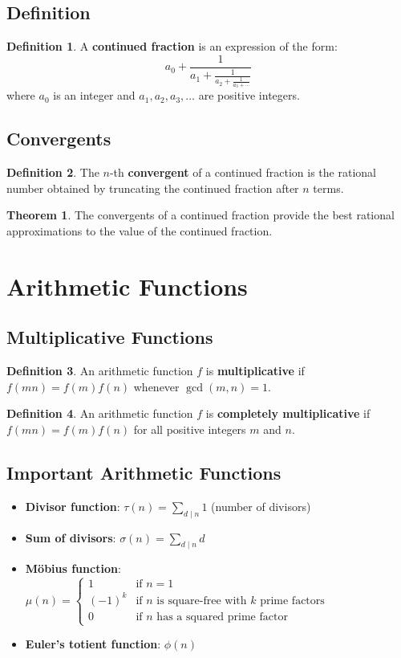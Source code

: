 \documentclass[11pt]{article}
\theoremstyle{definition}
\newtheorem{definition}{Definition}[section]
\newtheorem{theorem}{Theorem}[section]
\begin{document}
\subsection{Definition}
\begin{definition}
A \textbf{continued fraction} is an expression of the form:
$$a_0 + \frac{1}{a_1 + \frac{1}{a_2 + \frac{1}{a_3 + \cdots}}}$$
where $a_0$ is an integer and $a_1, a_2, a_3, \ldots$ are positive integers.
\end{definition}

\subsection{Convergents}
\begin{definition}
The $n$-th \textbf{convergent} of a continued fraction is the rational number obtained by truncating the continued fraction after $n$ terms.
\end{definition}

\begin{theorem}
The convergents of a continued fraction provide the best rational approximations to the value of the continued fraction.
\end{theorem}

\section{Arithmetic Functions}

\subsection{Multiplicative Functions}
\begin{definition}
An arithmetic function $f$ is \textbf{multiplicative} if $f(mn) = f(m)f(n)$ whenever $\gcd(m,n) = 1$.
\end{definition}

\begin{definition}
An arithmetic function $f$ is \textbf{completely multiplicative} if $f(mn) = f(m)f(n)$ for all positive integers $m$ and $n$.
\end{definition}

\subsection{Important Arithmetic Functions}
\begin{itemize}
    \item \textbf{Divisor function}: $\tau(n) = \sum_{d \mid n} 1$ (number of divisors)
    \item \textbf{Sum of divisors}: $\sigma(n) = \sum_{d \mid n} d$
    \item \textbf{Möbius function}: $\mu(n) = \begin{cases} 1 & \text{if } n = 1 \\ (-1)^k & \text{if } n \text{ is square-free with } k \text{ prime factors} \\ 0 & \text{if } n \text{ has a squared prime factor} \end{cases}$
    \item \textbf{Euler's totient function}: $\phi(n)$
\end{itemize}
\end{document}
